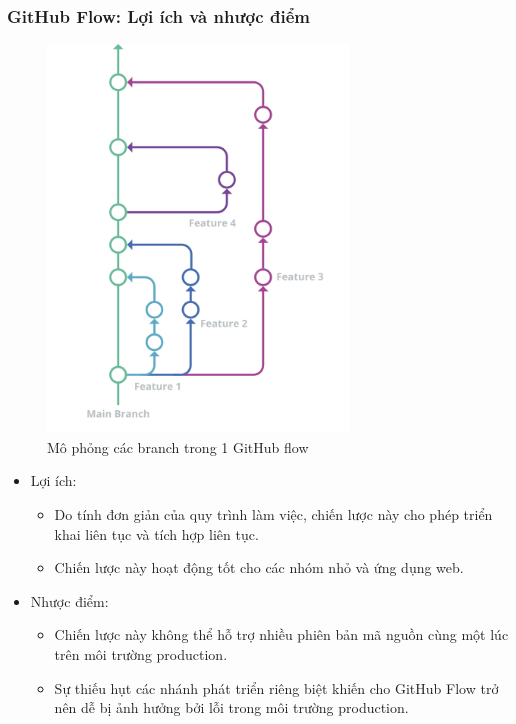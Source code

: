 \subsubsection{GitHub Flow: Lợi ích và nhược điểm}
\begin{figure}[H]
    \centering
    \includegraphics[width=8cm]{Images/githubflow.png}
    \vspace{0.5cm}
    \caption{Mô phỏng các branch trong 1 GitHub flow}
\end{figure}
\begin{itemize}
    \item Lợi ích:
    \begin{itemize}
    \item Do tính đơn giản của quy trình làm việc, chiến lược này cho phép triển khai liên tục và tích hợp liên tục.
    \item Chiến lược này hoạt động tốt cho các nhóm nhỏ và ứng dụng web.
    \end{itemize}

    \item Nhược điểm: 
    \begin{itemize}
    \item Chiến lược này không thể hỗ trợ nhiều phiên bản mã nguồn cùng một lúc trên môi trường production.
    \item Sự thiếu hụt các nhánh phát triển riêng biệt khiến cho GitHub Flow trở nên dễ bị ảnh hưởng bởi lỗi trong môi trường production.
    \end{itemize}
\end{itemize}

